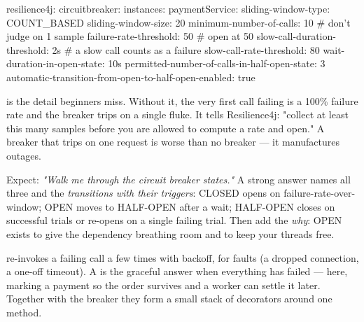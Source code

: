 \begin{yamlbox}
resilience4j:
  circuitbreaker:
    instances:
      paymentService:
        sliding-window-type: COUNT_BASED
        sliding-window-size: 20
        minimum-number-of-calls: 10      # don't judge on 1 sample
        failure-rate-threshold: 50        # open at 50%
        slow-call-duration-threshold: 2s  # a slow call counts as a failure
        slow-call-rate-threshold: 80
        wait-duration-in-open-state: 10s
        permitted-number-of-calls-in-half-open-state: 3
        automatic-transition-from-open-to-half-open-enabled: true
\end{yamlbox}

\begin{behind}
 is the detail beginners miss. Without it, the very first call failing is a 100\% failure rate and the breaker trips on a single fluke. It tells Resilience4j: "collect at least this many samples before you are allowed to compute a rate and open." A breaker that trips on one request is worse than no breaker --- it manufactures outages.
\end{behind}

\begin{interview}
Expect: \emph{"Walk me through the circuit breaker states."} A strong answer names all three and the \emph{transitions with their triggers}: CLOSED opens on failure-rate-over-window; OPEN moves to HALF-OPEN after a wait; HALF-OPEN closes on successful trials or re-opens on a single failing trial. Then add the \emph{why}: OPEN exists to give the dependency breathing room and to keep your threads free.
\end{interview}


  re-invokes a failing call a few times with backoff, for  faults (a dropped connection, a one-off timeout). A  is the graceful answer when everything has failed --- here, marking a payment  so the order survives and a worker can settle it later. Together with the breaker they form a small stack of decorators around one method.

